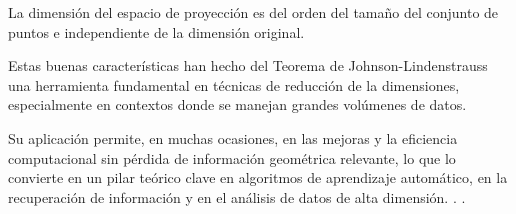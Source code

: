 La dimensión del espacio de proyección es del orden del
tamaño del conjunto de puntos e independiente de la dimensión original.


Estas buenas características han hecho del Teorema de Johnson-Lindenstrauss
una herramienta fundamental en técnicas de reducción de la dimensiones,
especialmente en contextos donde se manejan grandes volúmenes de datos.


Su aplicación permite, en muchas ocasiones, en las mejoras y la
eficiencia computacional sin pérdida de información geométrica relevante,
lo que lo convierte en un pilar teórico clave en algoritmos de aprendizaje
automático, en la recuperación de información y en el análisis de datos
de alta dimensión.
.
.
